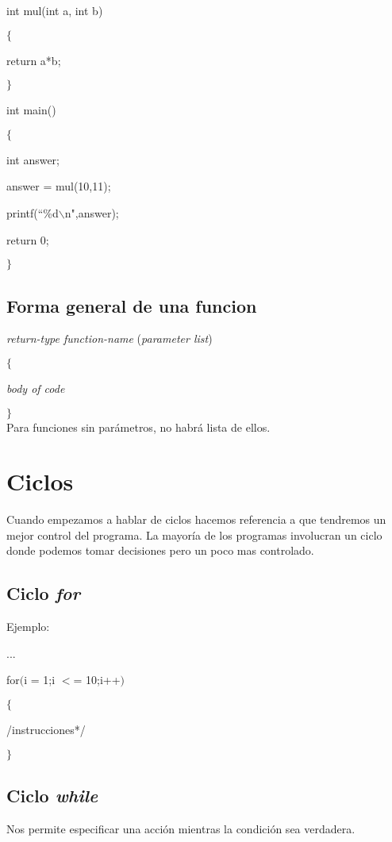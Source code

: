 \documentclass[]{article}
\begin{document}
	int mul(int a, int b)
	
	$\lbrace$
	
	return a*b;
	
	$\rbrace$
	
	int main()
	
	$\lbrace$
	
	int answer;
	
	answer = mul(10,11);
	
	printf(``\%d$\backslash$n",answer);
	
	return 0;
	
	$\rbrace$
	
	\subsection{Forma general de una funcion}
	\textit{return-type function-name} (\textit{parameter list})
	
	$\lbrace$
	
	\textit{body of code}
	
	$\rbrace$
	\\
	
	Para funciones sin parámetros, no habrá lista de ellos.
	
	\section{Ciclos}
	Cuando empezamos a hablar de ciclos hacemos referencia a que tendremos un mejor control del programa. La mayoría de los programas involucran un ciclo donde podemos tomar decisiones pero un poco mas controlado.
	
	\subsection{Ciclo \textit{for}}
	
	Ejemplo:
	
	...
	
	for$($i = 1;i $<$= 10;i++$)$
	
	$\lbrace$
	
	\slash*instrucciones*\slash
	
	$\rbrace$
	
	\subsection{Ciclo \textit{while}}
	Nos permite especificar una acción mientras la condición sea verdadera.\\
	
\end{document}
